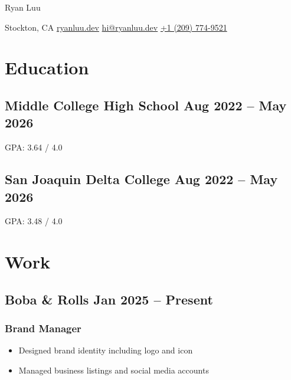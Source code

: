 \documentclass{my_cv}
\begin{document}
\centerline{\Large{Ryan Luu}}
\begin{center}
    Stockton, CA {\large\textperiodcentered} 
    \href{https://ryanluu.dev/}{ryanluu.dev} {\large\textperiodcentered} 
    \href{mailto:hi@ryanluu.dev}{hi@ryanluu.dev} {\large\textperiodcentered} 
    \href{tel:12097749521}{+1 (209) 774-9521}
\end{center}

\section{Education}
\subsection{Middle College High School \hfill Aug 2022 -- May 2026}
GPA: 3.64 / 4.0
\subsection{San Joaquin Delta College \hfill Aug 2022 -- May 2026}
GPA: 3.48 / 4.0

\section{Work}
\subsection{Boba \& Rolls \hfill Jan 2025 -- Present}
\subsubsection{Brand Manager}
\begin{itemize}
    \item Designed brand identity including logo and icon
    \item Managed business listings and social media accounts
\end{itemize}

\end{document}
